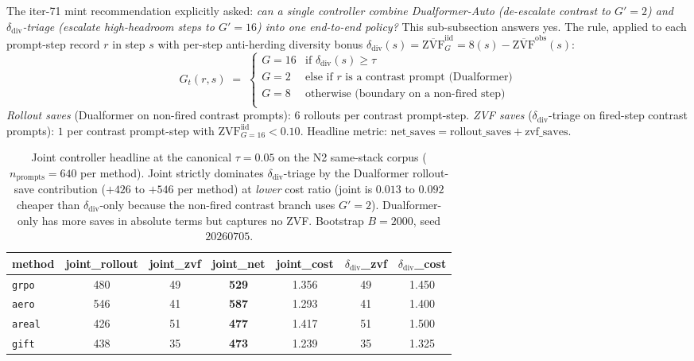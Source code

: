 The iter-71 mint recommendation explicitly asked: \emph{can a single
controller combine Dualformer-Auto (de-escalate contrast to $G'{=}2$)
and $\delta_{\mathrm{div}}$-triage (escalate high-headroom steps to
$G'{=}16$) into one end-to-end policy?} This sub-subsection answers
yes. The rule, applied to each prompt-step record $r$ in step $s$ with
per-step anti-herding diversity bonus
$\delta_{\mathrm{div}}(s) = \overline{\mathrm{ZVF}}^{\mathrm{iid}}_G{=}8(s)
- \overline{\mathrm{ZVF}}^{\mathrm{obs}}(s)$:
\begin{equation*}
G_t(r, s) \;=\; \begin{cases}
G{=}16 & \text{if $\delta_{\mathrm{div}}(s) \geq \tau$} \\
G{=}2  & \text{else if $r$ is a contrast prompt (Dualformer)} \\
G{=}8  & \text{otherwise (boundary on a non-fired step)} \\
\end{cases}
\end{equation*}
\emph{Rollout saves} (Dualformer on non-fired contrast prompts):
$6$ rollouts per contrast prompt-step. \emph{ZVF saves}
($\delta_{\mathrm{div}}$-triage on fired-step contrast prompts):
$1$ per contrast prompt-step with $\mathrm{ZVF}^{\mathrm{iid}}_{G{=}16} < 0.10$.
Headline metric: $\mathrm{net\_saves} = \mathrm{rollout\_saves} +
\mathrm{zvf\_saves}$.

\begin{table}[t]
\centering\small
\caption{Joint controller headline at the canonical $\tau{=}0.05$ on
the N2 same-stack corpus ($n_{\mathrm{prompts}}{=}640$ per method).
Joint strictly dominates $\delta_{\mathrm{div}}$-triage by the
Dualformer rollout-save contribution ($+426$ to $+546$ per method)
at \emph{lower} cost ratio (joint is $0.013$ to $0.092$ cheaper than
$\delta_{\mathrm{div}}$-only because the non-fired contrast branch uses
$G'{=}2$). Dualformer-only has more saves in absolute terms but
captures no ZVF. Bootstrap $B{=}2000$, seed $20260705$.}
\label{tab:p7-joint-controller}
\begin{tabular}{lcccccc}
\toprule
method & joint\_rollout & joint\_zvf & joint\_net & joint\_cost &
$\delta_{\mathrm{div}}$\_zvf & $\delta_{\mathrm{div}}$\_cost \\
\midrule
\texttt{grpo}  & 480 & 49 & \textbf{529} & 1.356 & 49 & 1.450 \\
\texttt{aero}  & 546 & 41 & \textbf{587} & 1.293 & 41 & 1.400 \\
\texttt{areal} & 426 & 51 & \textbf{477} & 1.417 & 51 & 1.500 \\
\texttt{gift}  & 438 & 35 & \textbf{473} & 1.239 & 35 & 1.325 \\
\bottomrule
\end{tabular}
\end{table}

